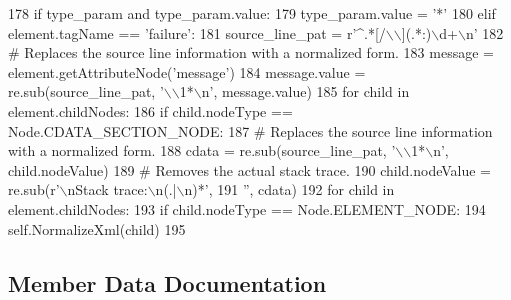 \begin{DoxyCode}
178       \textcolor{keywordflow}{if} type\_param \textcolor{keywordflow}{and} type\_param.value:
179         type\_param.value = \textcolor{stringliteral}{'*'}
180     \textcolor{keywordflow}{elif} element.tagName == \textcolor{stringliteral}{'failure'}:
181       source\_line\_pat = \textcolor{stringliteral}{r'^.*[/\(\backslash\)\(\backslash\)](.*:)\(\backslash\)d+\(\backslash\)n'}
182       \textcolor{comment}{# Replaces the source line information with a normalized form.}
183       message = element.getAttributeNode(\textcolor{stringliteral}{'message'})
184       message.value = re.sub(source\_line\_pat, \textcolor{stringliteral}{'\(\backslash\)\(\backslash\)1*\(\backslash\)n'}, message.value)
185       \textcolor{keywordflow}{for} child \textcolor{keywordflow}{in} element.childNodes:
186         \textcolor{keywordflow}{if} child.nodeType == Node.CDATA\_SECTION\_NODE:
187           \textcolor{comment}{# Replaces the source line information with a normalized form.}
188           cdata = re.sub(source\_line\_pat, \textcolor{stringliteral}{'\(\backslash\)\(\backslash\)1*\(\backslash\)n'}, child.nodeValue)
189           \textcolor{comment}{# Removes the actual stack trace.}
190           child.nodeValue = re.sub(\textcolor{stringliteral}{r'\(\backslash\)nStack trace:\(\backslash\)n(.|\(\backslash\)n)*'},
191                                    \textcolor{stringliteral}{''}, cdata)
192     \textcolor{keywordflow}{for} child \textcolor{keywordflow}{in} element.childNodes:
193       \textcolor{keywordflow}{if} child.nodeType == Node.ELEMENT\_NODE:
194         self.NormalizeXml(child)
195 \end{DoxyCode}


\subsection{Member Data Documentation}
